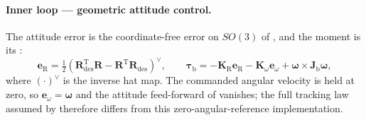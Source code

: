 \documentclass[headsepline,footsepline,footinclude=false,oneside,fontsize=11pt,paper=a4,listof=totoc,bibliography=totoc]{scrbook}
\theoremstyle{definition}
\theoremstyle{plain}
\theoremstyle{remark}
\newcommand{\vect}[1]{\boldsymbol{#1}}
\newcommand{\matr}[1]{\boldsymbol{#1}}
\newcommand{\trans}{^{\textrm{T}}}
\newcommand{\sidx}[1]{_{\textrm{#1}}}
\begin{document}
\paragraph{Inner loop --- geometric attitude control.} The attitude error is the coordinate-free
error on $SO(3)$ of \parencite[Eq.~(21)]{lee2010geometric}, and the moment is its
\parencite[Eq.~(20)]{lee2010geometric}:
\begin{equation}\label{eq:method:dep:inner}
  \vect{e}\sidx{R} = \tfrac{1}{2}\left(\matr{R}\sidx{des}\trans\matr{R} - \matr{R}\trans\matr{R}\sidx{des}\right)^{\vee},
  \qquad
  \vect{\tau}\sidx{b} = -\matr{K}\sidx{R}\vect{e}\sidx{R} - \matr{K}_{\omega}\vect{e}_{\omega}
      + \vect{\omega}\times\matr{J}\sidx{b}\vect{\omega},
\end{equation}
where $(\cdot)^{\vee}$ is the inverse hat map. The commanded angular velocity is held at zero, so
$\vect{e}_{\omega} = \vect{\omega}$ and the attitude feed-forward of
\parencite[Eq.~(20)]{lee2010geometric} vanishes; the full tracking law assumed by \parencite[Prop.~3]{lee2010geometric} therefore differs from this
zero-angular-reference implementation.
\end{document}
